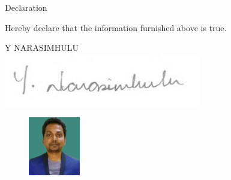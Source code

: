 \documentclass{resume} %
\begin{document}
\begin{rSection}{Declaration}
	
	\begin{rSubsection}{}{}{}{}	
		\item[] Hereby declare that the information furnished above is true.
	\end{rSubsection}

	\vspace{1cm}

	\begin{flushright}
		Y NARASIMHULU \\
		\includegraphics[scale=0.75]{signature.jpg}
	\end{flushright}


\begin{figure}[!hbt]
		\begin{flushright}
			\includegraphics[width=0.2\textwidth]{Narasimpassport.jpg}
		\end{flushright}
\end{figure}

	
\end{rSection}




\end{document}
